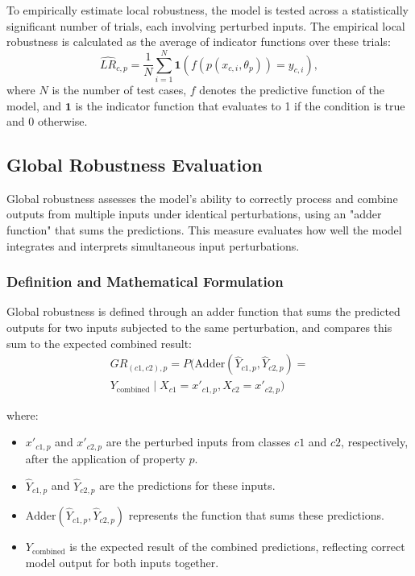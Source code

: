 \documentclass[10pt, conference, a4paper, final]{IEEEtran}
\begin{document}
\begin{itemize}
        To empirically estimate local robustness, the model is tested across a statistically significant number of trials, each involving perturbed inputs. The empirical local robustness is calculated as the average of indicator functions over these trials:
        \begin{equation}
            \hat{LR}_{c,p} = \frac{1}{N} \sum_{i=1}^N \mathbf{1}(f(p(x_{c,i}, \theta_p)) = y_{c,i}),
        \end{equation}
        where \(N\) is the number of test cases, \(f\) denotes the predictive function of the model, and \(\mathbf{1}\) is the indicator function that evaluates to 1 if the condition is true and 0 otherwise.



        \subsection{Global Robustness Evaluation}
        Global robustness assesses the model's ability to correctly process and combine outputs from multiple inputs under identical perturbations, using an "adder function" that sums the predictions. This measure evaluates how well the model integrates and interprets simultaneous input perturbations.
        
        \subsubsection{Definition and Mathematical Formulation}
        
        Global robustness is defined through an adder function that sums the predicted outputs for two inputs subjected to the same perturbation, and compares this sum to the expected combined result:
        \begin{multline}
            GR_{(c1, c2), p} = P(\text{Adder}(\hat{Y}_{c1,p}, \hat{Y}_{c2,p}) = \\
            Y_{\text{combined}} \mid X_{c1} = x'_{c1,p}, X_{c2} = x'_{c2,p})
        \end{multline}
        
        where:
        \begin{itemize}
            \item \(x'_{c1,p}\) and \(x'_{c2,p}\) are the perturbed inputs from classes \(c1\) and \(c2\), respectively, after the application of property \(p\).
            \item \(\hat{Y}_{c1,p}\) and \(\hat{Y}_{c2,p}\) are the predictions for these inputs.
            \item \(\text{Adder}(\hat{Y}_{c1,p}, \hat{Y}_{c2,p})\) represents the function that sums these predictions.
            \item \(Y_{\text{combined}}\) is the expected result of the combined predictions, reflecting correct model output for both inputs together.
        \end{itemize}
        



\end{itemize}
\end{document}
